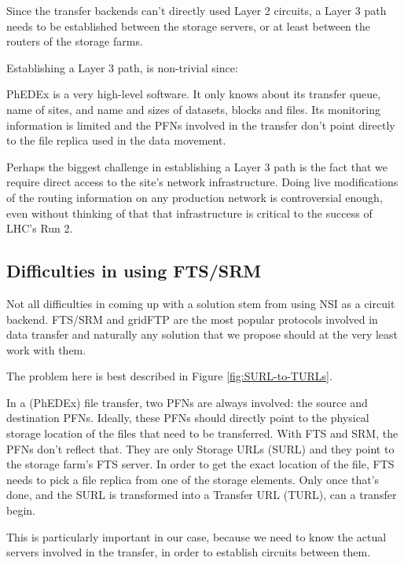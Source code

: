 Since the transfer backends can't directly used Layer 2 circuits, a Layer 3 path needs to be 
established between the storage servers, or at least between the routers of the storage farms.

Establishing a Layer 3 path, is non-trivial since:
\begin{description}[style=unboxed,leftmargin=0cm]
  \item[It requires topology and routing info:] PhEDEx is a very high-level software. It only 
  knows about its transfer queue, name of sites, and name and sizes of datasets, blocks and 
  files. Its monitoring information is limited and the PFNs involved in the transfer don't 
  point directly to the file replica used in the data movement. 
  \item[Direct access to the site's network:] Perhaps the biggest challenge in establishing 
  a Layer 3 path is the fact that we require direct access to the site's network infrastructure.
  Doing live modifications of the routing information on any production network is controversial 
  enough, even without thinking of that that infrastructure is critical to the success of LHC's 
  Run 2.
\end{description}

\subsection{Difficulties in using FTS/SRM}

Not all difficulties in coming up with a solution stem from using NSI as a circuit backend.
FTS/SRM and gridFTP are the most popular protocols involved in data transfer and naturally 
any solution that we propose should at the very least work with them. 

The problem here is best described in Figure \ref{fig:SURL-to-TURLs}.

In a (PhEDEx) file transfer, two PFNs are always involved: the source and destination PFNs. 
Ideally, these PFNs should directly point to the physical storage location 
of the files that need to be transferred. With FTS and SRM, the PFNs don't reflect that. 
They are only Storage URLs (SURL) and they point to the storage farm's FTS server. 
In order to get the exact location of the file, FTS needs to pick a file replica from one 
of the storage elements. Only once that's done, and the SURL is transformed into a Transfer 
URL (TURL), can a transfer begin.

This is particularly important in our case, because we need to know the actual servers 
involved in the transfer, in order to establish circuits between them.

